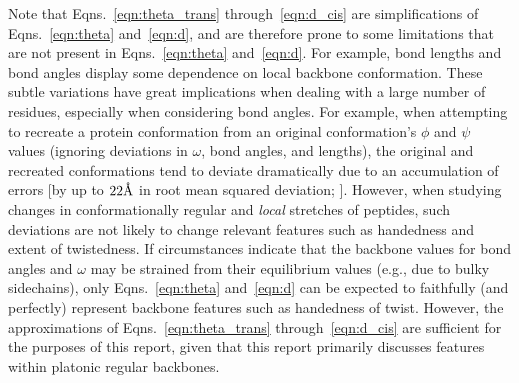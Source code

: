 \documentclass[fleqn,10pt,lineno]{wlpeerj} %
\newcommand{\Eqns}[1]{Eqns.~\ref{#1}}
\begin{document}
Note that \Eqns{eqn:theta_trans} through~\ref{eqn:d_cis} are simplifications of \Eqns{eqn:theta} and~\ref{eqn:d}, and are therefore prone to some limitations that are not present in \Eqns{eqn:theta} and~\ref{eqn:d}. For example, bond lengths \citep{Improta2015} and bond angles \citep{Esposito2013,Improta2015a} display some dependence on local backbone conformation. These subtle variations have great implications when dealing with a large number of residues, especially when considering bond angles. For example, when attempting to recreate a protein conformation from an original conformation's $\phi$ and $\psi$ values (ignoring deviations in $\omega$, bond angles, and lengths), the original and recreated conformations tend to deviate dramatically due to an accumulation of errors [by up to $22\textrm\AA$ in root mean squared deviation; \cite{Tien2013}]. However, when studying changes in conformationally regular and {\em local} stretches of peptides, such deviations are not likely to change relevant features such as handedness and extent of twistedness. If circumstances indicate that the backbone values for bond angles and $\omega$ may be strained from their equilibrium values (e.g., due to bulky sidechains), only \Eqns{eqn:theta} and~\ref{eqn:d} can be expected to faithfully (and perfectly) represent backbone features such as handedness of twist. However, the approximations of \Eqns{eqn:theta_trans} through~\ref{eqn:d_cis} are sufficient for the purposes of this report, given that this report primarily discusses features within platonic regular backbones.
\end{document}
